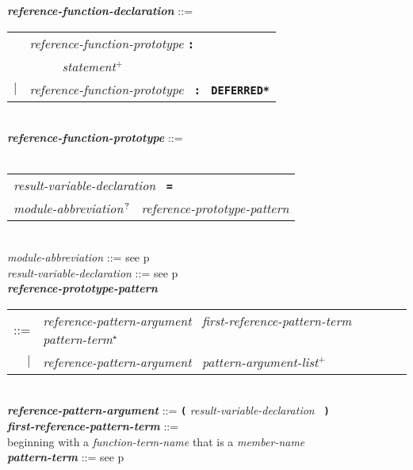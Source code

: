 \documentclass[12pt]{article}
\newcommand{\TT}[1]{{\tt \bfseries #1}}
\newcommand{\STAR}{{\Large $^\star$}}
\newcommand{\PLUS}[1][]{{$^{+#1}$}}
\newcommand{\QMARK}{{$^{\,\mbox{\footnotesize ?}}$}}
\newcommand{\ttkey}[1]{{\tt \bfseries #1}}
\newcommand{\emkey}[1]{{\em \bfseries #1}}
\newcommand{\pagref}[1]{p\pageref{#1}}
\newenvironment{indpar}[1][0.3in]%
	{\begin{list}{}%
		     {\setlength{\itemsep}{0in}%
		      \setlength{\topsep}{0in}%
		      \setlength{\parsep}{1ex}%
		      \setlength{\labelwidth}{#1}%
		      \setlength{\leftmargin}{#1}%
		      \addtolength{\leftmargin}{\labelsep}}%
	 \item}%
	{\end{list}}
\begin{document}
\begin{indpar}[0.1in]
\emkey{reference-function-declaration}\label{REFEREMCE-FUNCTION-DECLARATION}
	::= \\
\hspace*{2em}
    \begin{tabular}[t]{rl}
        &  {\em reference-function-prototype} \TT{:} \\
	& \TT{~~~~~}{\em statement}\PLUS{} \\
    $|$ &  {\em reference-function-prototype}~ \TT{:}~ \ttkey{*DEFERRED*} \\
    \end{tabular}
\\[2ex]
\emkey{reference-function-prototype}\label{REFERENCE-FUNCTION-PROTOTYPE} ::= \\
\hspace*{0.25in}\ttkey{reference function}~
    \begin{tabular}[t]{@{}l}
        {\em result-variable-declaration}~ \TT{=} \\
        {\em module-abbreviation}\QMARK{}~ {\em reference-prototype-pattern} \\
    \end{tabular}
\\[0.5ex]
{\em module-abbreviation} ::= see \pagref{MODULE-ABBREVIATION}
\\[0.5ex]
{\em result-variable-declaration} ::= see \pagref{RESULT-VARIABLE-DECLARATION}
\\[0.5ex]
\emkey{reference-prototype-pattern}\label{REFERENCE-PROTOTYPE-PATTERN} \\
\hspace*{2em}\begin{tabular}[t]{rl}
    ::= & {\em reference-pattern-argument}~
          {\em first-reference-pattern-term}~
          {\em pattern-term}\STAR{} \\
    $|$ & {\em reference-pattern-argument}~ {\em pattern-argument-list}\PLUS{}
    \end{tabular}
\\[0.5ex]
\emkey{reference-pattern-argument} ::=
    \TT{(} {\em result-variable-declaration}~ \TT{)}
\\[0.5ex]
\emkey{first-reference-pattern-term} ::= \\
\hspace*{2em}{\em pattern-term} beginning with
   a {\em function-term-name} that is a {\em member-name}
\\[0.5ex]
\emkey{pattern-term} ::= see \pagref{PATTERN-TERM}

\end{indpar}
\end{document}
